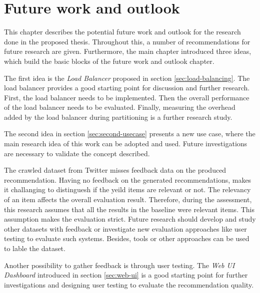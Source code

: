 \chapter{Future work and outlook}
\label{chap:future-work}
This chapter describes the potential future work and outlook for the research done in the proposed thesis. Throughout this, a number of recommendations for future research are given. Furthermore, the main chapter introduced three ideas, which build the basic blocks of the future work and outlook chapter. 


The first idea is the \emph{Load Balancer} proposed in section \ref{sec:load-balancing}. The load balancer provides a good starting point for discussion and further research. First, the load balancer needs to be implemented. Then the overall performance of the load balancer needs to be evaluated. Finally, measuring the overhead added by the load balancer during partitioning is a further research study.


The second idea in section \ref{sec:second-usecase} presents a new use case, where the main research idea of this work can be adopted and used. Future investigations are necessary to validate the concept described.


The crawled dataset from Twitter misses feedback data on the produced recommendation. Having no feedback on the generated recommendations, makes it challanging to distinguesh if the yeild items are relevant or not. The relevancy of an item affects the overall evaluation result. Therefore, during the assessment, this research assumes that all the results in the baseline were relevant items. This assumption makes the evaluation strict. Future research should develop and study other datasets with feedback or investigate new evaluation approaches like user testing to evaluate such systems. Besides, tools or other approaches can be used to lable the dataset.


Another possibility to gather feedback is through user testing. The \emph{Web UI Dashboard} introduced in section \ref{sec:web-ui} is a good starting point for further investigations and designing user testing to evaluate the recommendation quality.


